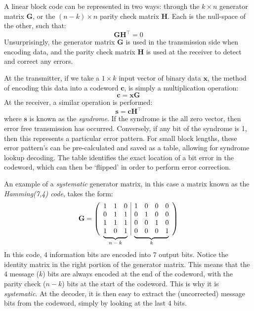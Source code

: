 \documentclass[11pt]{article}
\newcommand\undermat[2]{%
  \makebox[0pt][l]{$\smash{\underbrace{\phantom{%
    \begin{matrix}#2\end{matrix}}}_{\text{$#1$}}}$}#2}
\numberwithin{equation}{subsection}
\begin{document}
A linear block code can be represented in two ways: through the $k \times n$ generator matrix $\mathbf{G}$, or the $(n - k) \times n$ parity check matrix $\mathbf{H}$. Each is the null-space of the other, such that:
\begin{equation}
\mathbf{G H}^\top = 0
\end{equation}
Unsurprisingly, the generator matrix $\mathbf{G}$ is used in the transmission side when encoding data, and the parity check matrix $\mathbf{H}$ is used at the receiver to detect and correct any errors.

At the transmitter, if we take a $1 \times k$ input vector of binary data $\mathbf{x}$, the method of encoding this data into a codeword $\mathbf{c}$, is simply a multiplication operation:
\begin{equation}
\mathbf{c = xG}
\end{equation}
At the receiver, a similar operation is performed:
\begin{equation}
\mathbf{s = c H}^\top
\end{equation}
where $\mathbf{s}$ is known as the \textit{syndrome}. If the syndrome is the all zero vector, then error free transmission has occurred. Conversely, if any bit of the syndrome is 1, then this represents a particular error pattern. For small block lengths, these error pattern's can be pre-calculated and saved as a table, allowing for syndrome lookup decoding. The table identifies the exact location of a bit error in the codeword, which can then be `flipped' in order to perform error correction.

An example of a \textit{systematic} generator matrix, in this case a matrix known as the \textit{Hamming(7,4) code}, takes the form:
\begin{equation}
\mathbf{G} = 
\left(
\begin{array}{ccc|cccc}
  1 & 1 & 0 & 1 & 0 & 0 & 0 \\
  0 & 1 & 1 & 0 & 1 & 0 & 0 \\
  1 & 1 & 1 & 0 & 0 & 1 & 0 \\
  \undermat{n-k}{1 & 0 & 1} & \undermat{k}{0 & 0 & 0 & 1} \\
  \end{array}
\right)
\end{equation}
\\
In this code, 4 information bits are encoded into 7 output bits.
Notice the identity matrix in the right portion of the generator matrix. This means that the 4 message ($k$) bits are always encoded at the end of the codeword, with the parity check ($n-k$) bits at the start of the codeword. This is why it is \textit{systematic}. At the decoder, it is then easy to extract the (uncorrected) message bits from the codeword, simply by looking at the last 4 bits.
\end{document}
